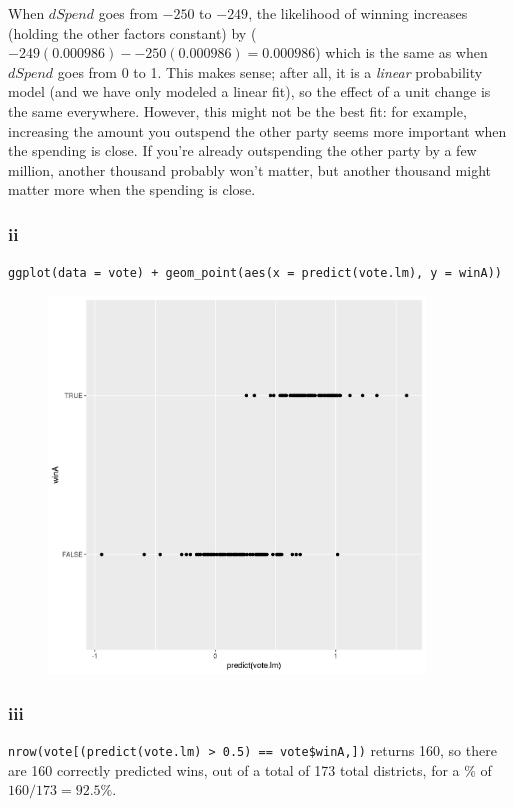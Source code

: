 \documentclass[12pt,letterpaper]{article}
\theoremstyle{definition}
\begin{document}
When $dSpend$ goes from $-250$ to $-249$, the likelihood of winning increases (holding the other factors constant) by ($-249(0.000986) - -250(0.000986) = 0.000986$) which is the same as when $dSpend$ goes from $0$ to 1. This makes sense; after all, it is a \textit{linear} probability model (and we have only modeled a linear fit), so the effect of a unit change is the same everywhere. However, this might not be the best fit: for example, increasing the amount you outspend the other party seems more important when the spending is close. If you're already outspending the other party by a few million, another thousand probably won't matter, but another thousand might matter more when the spending is close.

\subsubsection*{ii}

\verb|ggplot(data = vote) + geom_point(aes(x = predict(vote.lm), y = winA))|
\begin{figure}[H]
  \begin{center}
    \includegraphics*[width=10cm]{2aii.png}
  \end{center}
\end{figure}

\subsubsection*{iii}

\verb|nrow(vote[(predict(vote.lm) > 0.5) == vote$winA,])| returns 160, so there are 160 correctly predicted wins, out of a total of 173 total districts, for a \% of $160/173 = 92.5\%$.
\end{document}
